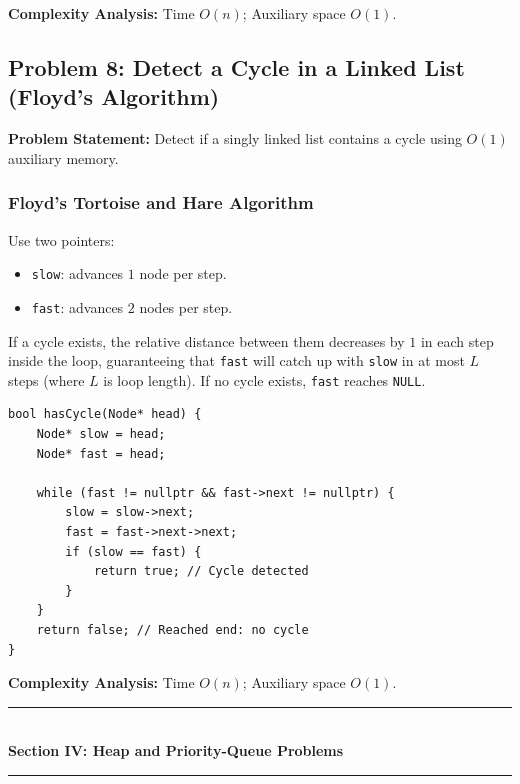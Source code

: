 \textbf{Complexity Analysis:} Time $O(n)$; Auxiliary space $O(1)$.

\subsection{Problem 8: Detect a Cycle in a Linked List (Floyd's Algorithm)}

\textbf{Problem Statement:} Detect if a singly linked list contains a cycle using $O(1)$ auxiliary memory.

\subsubsection*{Floyd's Tortoise and Hare Algorithm}
Use two pointers:
\begin{itemize}
    \item \texttt{slow}: advances $1$ node per step.
    \item \texttt{fast}: advances $2$ nodes per step.
\end{itemize}
If a cycle exists, the relative distance between them decreases by $1$ in each step inside the loop, guaranteeing that \texttt{fast} will catch up with \texttt{slow} in at most $L$ steps (where $L$ is loop length). If no cycle exists, \texttt{fast} reaches \texttt{NULL}.

\begin{lstlisting}[style=cppstyle, caption={C++ Cycle Detection using Floyd's Algorithm.}]
bool hasCycle(Node* head) {
    Node* slow = head;
    Node* fast = head;

    while (fast != nullptr && fast->next != nullptr) {
        slow = slow->next;
        fast = fast->next->next;
        if (slow == fast) {
            return true; // Cycle detected
        }
    }
    return false; // Reached end: no cycle
}
\end{lstlisting}

\textbf{Complexity Analysis:} Time $O(n)$; Auxiliary space $O(1)$.

\newpage
\begin{center}
\vspace{0.5em}
{\color{primary}\rule{0.45\textwidth}{1.2pt}}\\[4pt]
{\Large\bfseries\color{primary} Section IV: Heap and Priority-Queue Problems}\\[2pt]
{\color{primary}\rule{0.45\textwidth}{1.2pt}}
\vspace{0.5em}
\end{center}

